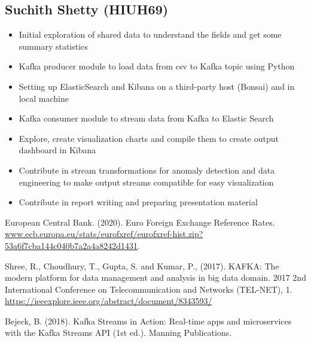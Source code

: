 \documentclass{article}
\begin{document}
\subsection{Suchith Shetty (HIUH69)}
\begin{itemize}
    \item Initial exploration of shared data to understand the fields and get some summary statistics
    \item Kafka producer module to load data from csv to Kafka topic using Python
    \item Setting up ElasticSearch and Kibana on a third-party host (Bonsai) and in local machine
    \item Kafka consumer module to stream data from Kafka to Elastic Search
    \item Explore, create visualization charts and compile them to create output dashboard in Kibana
    \item Contribute in stream transformations for anomaly detection and data engineering to make output streams compatible for easy visualization
    \item Contribute in report writing and preparing presentation material
\end{itemize}


\begin{thebibliography}{9}

European Central Bank. (2020). Euro Foreign Exchange Reference Rates. \url{www.ecb.europa.eu/stats/eurofxref/eurofxref-hist.zip?53a6f7cba144c040b7a2a4a8242d1431}.

Shree, R., Choudhury, T., Gupta, S. and Kumar, P., (2017). KAFKA: The modern platform for data management and analysis in big data domain. 2017 2nd International Conference on Telecommunication and Networks (TEL-NET), 1. \url{https://ieeexplore.ieee.org/abstract/document/8343593/}

Bejeck, B. (2018). Kafka Streams in Action: Real-time apps and microservices with the Kafka Streams API (1st ed.). Manning Publications.

\end{thebibliography}
\end{document}
